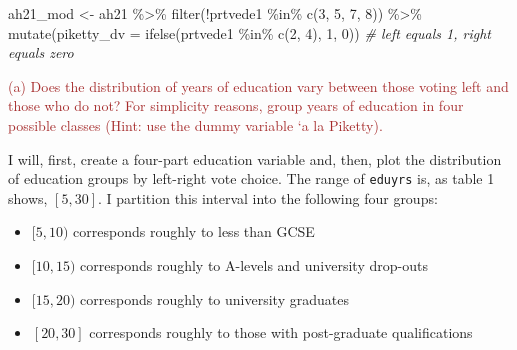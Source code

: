 \documentclass[
]{article}
\newenvironment{Shaded}{\begin{snugshade}}{\end{snugshade}}
\newcommand{\AttributeTok}[1]{\textcolor[rgb]{0.77,0.63,0.00}{#1}}
\newcommand{\CommentTok}[1]{\textcolor[rgb]{0.56,0.35,0.01}{\textit{#1}}}
\newcommand{\DecValTok}[1]{\textcolor[rgb]{0.00,0.00,0.81}{#1}}
\newcommand{\FunctionTok}[1]{\textcolor[rgb]{0.00,0.00,0.00}{#1}}
\newcommand{\NormalTok}[1]{#1}
\newcommand{\OtherTok}[1]{\textcolor[rgb]{0.56,0.35,0.01}{#1}}
\newcommand{\SpecialCharTok}[1]{\textcolor[rgb]{0.00,0.00,0.00}{#1}}
\providecommand{\tightlist}{%
  \setlength{\itemsep}{0pt}\setlength{\parskip}{0pt}}
\begin{document}
\begin{Shaded}
\begin{Highlighting}[]
\NormalTok{ah21\_mod }\OtherTok{\textless{}{-}}\NormalTok{ ah21 }\SpecialCharTok{\%\textgreater{}\%}
  \FunctionTok{filter}\NormalTok{(}\SpecialCharTok{!}\NormalTok{prtvede1 }\SpecialCharTok{\%in\%} \FunctionTok{c}\NormalTok{(}\DecValTok{3}\NormalTok{, }\DecValTok{5}\NormalTok{, }\DecValTok{7}\NormalTok{, }\DecValTok{8}\NormalTok{)) }\SpecialCharTok{\%\textgreater{}\%}
  \FunctionTok{mutate}\NormalTok{(}\AttributeTok{piketty\_dv =} \FunctionTok{ifelse}\NormalTok{(prtvede1 }\SpecialCharTok{\%in\%} \FunctionTok{c}\NormalTok{(}\DecValTok{2}\NormalTok{, }\DecValTok{4}\NormalTok{), }\DecValTok{1}\NormalTok{, }\DecValTok{0}\NormalTok{)) }\CommentTok{\# left equals 1, right equals zero }
\end{Highlighting}
\end{Shaded}

\textcolor{brown}{(a) Does the distribution of years of education vary between those voting left and those who do not? For simplicity reasons, group years of education in four possible classes (Hint: use the dummy variable `a la Piketty).}

I will, first, create a four-part education variable and, then, plot the
distribution of education groups by left-right vote choice. The range of
\texttt{eduyrs} is, as table 1 shows, \([5, 30]\). I partition this
interval into the following four groups:

\begin{itemize}
\tightlist
\item
  \([5, 10)\) corresponds roughly to less than GCSE
\item
  \([10, 15)\) corresponds roughly to A-levels and university drop-outs
\item
  \([15, 20)\) corresponds roughly to university graduates
\item
  \([20, 30]\) corresponds roughly to those with post-graduate
  qualifications
\end{itemize}
\end{document}
